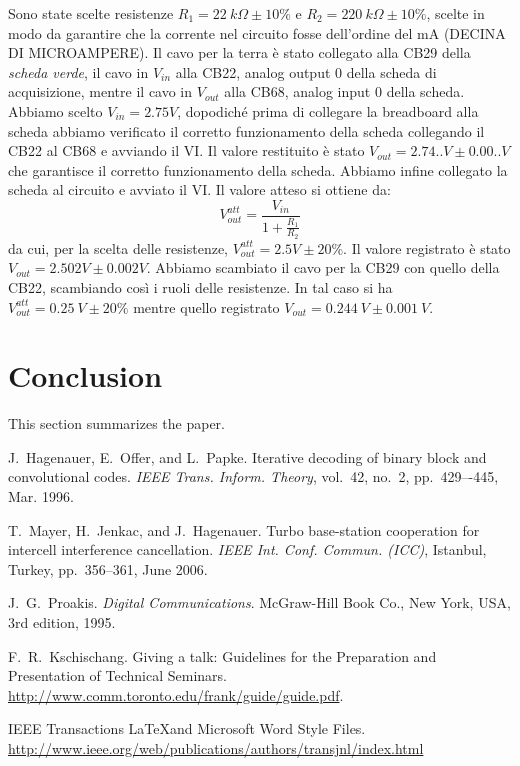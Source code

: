 \documentclass[journal, a4paper]{IEEEtran}
\begin{document}
Sono state scelte resistenze $R_1 = 22 ~ k\Omega \pm 10 \%$ e $R_2 = 220~ k\Omega \pm 10 \%$, scelte in modo da garantire che la corrente nel circuito fosse dell'ordine del mA (DECINA DI MICROAMPERE). Il cavo per la terra è stato collegato alla CB29 della \textit{scheda verde}, il cavo in $V_{in}$ alla CB22, analog output 0 della scheda di acquisizione, mentre il cavo in $V_{out}$ alla CB68, analog input 0 della scheda. Abbiamo scelto $V_{in} = 2.75 V$, dopodiché prima di collegare la breadboard alla scheda abbiamo verificato il corretto funzionamento della scheda collegando il CB22 al CB68 e avviando il VI. Il valore restituito è stato $V_{out} = 2.74.. V \pm 0.00.. V$ che garantisce il corretto funzionamento della scheda. Abbiamo infine collegato la scheda al circuito e avviato il VI. Il valore atteso si ottiene da:
\begin{equation}
V_{out}^{att}= \frac{V_{in}}{1+\frac{R_1}{R_2}}
\end{equation}
da cui, per la scelta delle resistenze, $V_{out}^{att} = 2.5 V \pm 20 \%$. Il valore registrato è stato $V_{out} = 2.502 V \pm 0.002 V$. Abbiamo scambiato il cavo per la CB29 con quello della CB22, scambiando così i ruoli delle resistenze. In tal caso si ha $V_{out}^{att} = 0.25~ V \pm 20 \%$ mentre quello registrato $V_{out} = 0.244 ~V \pm 0.001 ~V$.


\section{Conclusion}
	This section summarizes the paper.

\begin{thebibliography}{5}

	J.~Hagenauer, E.~Offer, and L.~Papke. Iterative decoding of binary block
	and convolutional codes. {\em IEEE Trans. Inform. Theory},
	vol.~42, no.~2, pp.~429–-445, Mar. 1996.

	T.~Mayer, H.~Jenkac, and J.~Hagenauer. Turbo base-station cooperation for intercell interference cancellation. {\em IEEE Int. Conf. Commun. (ICC)}, Istanbul, Turkey, pp.~356--361, June 2006.

	J.~G.~Proakis. {\em Digital Communications}. McGraw-Hill Book Co.,
	New York, USA, 3rd edition, 1995.

	F.~R.~Kschischang. Giving a talk: Guidelines for the Preparation and Presentation of Technical Seminars.
	\url{http://www.comm.toronto.edu/frank/guide/guide.pdf}.

	IEEE Transactions \LaTeX and Microsoft Word Style Files.
	\url{http://www.ieee.org/web/publications/authors/transjnl/index.html}

\end{thebibliography}

\end{document}
